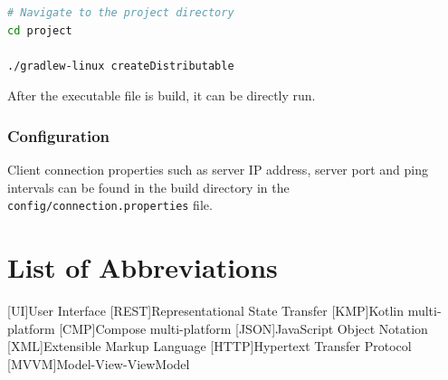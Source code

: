 \documentclass[english, sem, kiv, he, iso690alph, pdf, viewonly]{fasthesis}
\begin{document}
\begin{lstlisting}[language=bash, caption={Example of client build on Linux}, label={lst:client_build}]
# Navigate to the project directory
cd project

./gradlew-linux createDistributable
\end{lstlisting}

After the executable file is build, it can be directly run.

\subsection{Configuration}
Client connection properties such as server IP address, server port and ping intervals can be found in the build directory in the \texttt{config/connection.properties} file.


%
%
%
%

\appendix
%
%
%
%
\chapter{List of Abbreviations}\label{app:abbreviations}

\begin{acronym}
	[UI]{User Interface}
	[REST]{Representational State Transfer}
	[KMP]{Kotlin multi-platform}
	[CMP]{Compose multi-platform}
	[JSON]{JavaScript Object Notation}
	[XML]{Extensible Markup Language}
	[HTTP]{Hypertext Transfer Protocol}
	[MVVM]{Model-View-ViewModel}
\end{acronym}


%
%
%
%
\backmatter
\listoffigures 
\listoftables
\listoflistings
%
%
\backpage
\end{document}
